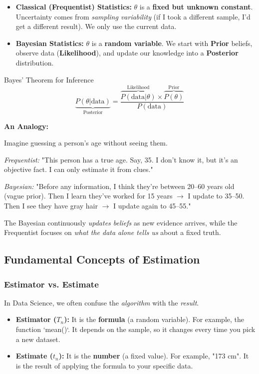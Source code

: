 \begin{itemize}
    \item \textbf{Classical (Frequentist) Statistics:} $\theta$ is a \textbf{fixed but unknown constant}. Uncertainty comes from \textit{sampling variability} (if I took a different sample, I'd get a different result). We only use the current data.
    \item \textbf{Bayesian Statistics:} $\theta$ is a \textbf{random variable}. We start with \textbf{Prior} beliefs, observe data (\textbf{Likelihood}), and update our knowledge into a \textbf{Posterior} distribution.
\end{itemize}

\begin{defbox}{Bayes' Theorem for Inference}
\[
\underbrace{P(\theta | \text{data})}_{\text{Posterior}} = \frac{\overbrace{P(\text{data} | \theta)}^{\text{Likelihood}} \times \overbrace{P(\theta)}^{\text{Prior}}}{P(\text{data})}
\]
\end{defbox}


\vs

\begin{example} {\textbf{An Analogy:}}
  
  Imagine guessing a person's age without seeing them.

\textit{Frequentist:} "This person has a true age.  Say, 35. I don't know it, but it's an objective fact. I can only estimate it from clues."

\textit{Bayesian:} "Before any information, I think they're between 20–60 years old (vague prior). Then I learn they've worked for 15 years $\rightarrow$ I update to 35–50. Then I see they have gray hair $\rightarrow$ I update again to 45–55."

The Bayesian continuously \textit{updates beliefs} as new evidence arrives, while the Frequentist focuses on \textit{what the data alone tells us} about a fixed truth.

\end{example}

\subsection{Fundamental Concepts of Estimation}

\subsubsection{Estimator vs. Estimate}
In Data Science, we often confuse the \textit{algorithm} with the \textit{result}.
\begin{itemize}
    \item \textbf{Estimator ($T_n$):} It is the \textbf{formula} (a random variable). For example, the function `mean()`. It depends on the sample, so it changes every time you pick a new dataset.
    \item \textbf{Estimate ($t_n$):} It is the \textbf{number} (a fixed value). For example, "173 cm". It is the result of applying the formula to your specific data.
\end{itemize}

